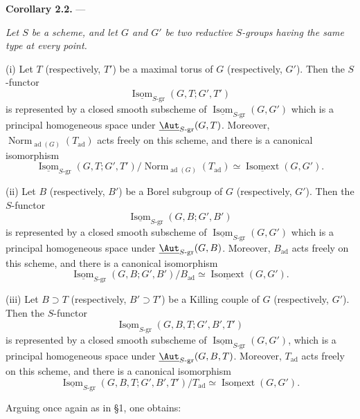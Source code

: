 \medskip\noindent\textbf{Corollary 2.2.} ---
{\itshape Let \(S\) be a scheme, and let \(G\) and \(G'\) be two reductive
\(S\)-groups having the same type at every point.

\textup{(i)} Let \(T\) \textup{(}respectively, \(T'\)\textup{)} be a maximal torus of \(G\)
\textup{(}respectively, \(G'\)\textup{)}. Then the \(S\)-functor
\[
  \underline{\operatorname{Isom}}_{S\text{-}\mathrm{gr}}
    (G,T;G',T')
\]
is represented by a closed smooth subscheme of
\(\underline{\operatorname{Isom}}_{S\text{-}\mathrm{gr}}(G,G')\)
which is a principal homogeneous space under
\(\underline{\Aut}_{S\text{-}\mathrm{gr}}(G,T)\).
Moreover,
\(\operatorname{Norm}_{\operatorname{ad}(G)}(T_{\mathrm{ad}})\)
acts freely on this scheme, and there is a canonical isomorphism
\[
  \underline{\operatorname{Isom}}_{S\text{-}\mathrm{gr}}
    (G,T;G',T')
  \big/
  \operatorname{Norm}_{\operatorname{ad}(G)}(T_{\mathrm{ad}})
  \simeq
  \underline{\operatorname{Isomext}}(G,G').
\]

\textup{(ii)} Let \(B\) \textup{(}respectively, \(B'\)\textup{)} be a Borel subgroup of \(G\)
\textup{(}respectively, \(G'\)\textup{)}. Then the \(S\)-functor
\[
  \underline{\operatorname{Isom}}_{S\text{-}\mathrm{gr}}
    (G,B;G',B')
\]
is represented by a closed smooth subscheme of
\(\underline{\operatorname{Isom}}_{S\text{-}\mathrm{gr}}(G,G')\)
which is a principal homogeneous space under
\(\underline{\Aut}_{S\text{-}\mathrm{gr}}(G,B)\).
Moreover, \(B_{\mathrm{ad}}\) acts freely on this scheme, and there
is a canonical isomorphism
\[
  \underline{\operatorname{Isom}}_{S\text{-}\mathrm{gr}}
    (G,B;G',B')
  \big/B_{\mathrm{ad}}
  \simeq
  \underline{\operatorname{Isomext}}(G,G').
\]

\textup{(iii)} Let \(B\supset T\) \textup{(}respectively, \(B'\supset T'\)\textup{)} be a
Killing couple of \(G\) \textup{(}respectively, \(G'\)\textup{)}. Then the \(S\)-functor
\[
  \underline{\operatorname{Isom}}_{S\text{-}\mathrm{gr}}
    (G,B,T;G',B',T')
\]
is represented by a closed smooth subscheme of
\(\underline{\operatorname{Isom}}_{S\text{-}\mathrm{gr}}(G,G')\),
which is a principal homogeneous space under
\(\underline{\Aut}_{S\text{-}\mathrm{gr}}(G,B,T)\).
Moreover, \(T_{\mathrm{ad}}\) acts freely on this scheme, and there
is a canonical isomorphism
\[
  \underline{\operatorname{Isom}}_{S\text{-}\mathrm{gr}}
    (G,B,T;G',B',T')
  \big/T_{\mathrm{ad}}
  \simeq
  \underline{\operatorname{Isomext}}(G,G').
\]}

Arguing once again as in \S1, one obtains:

